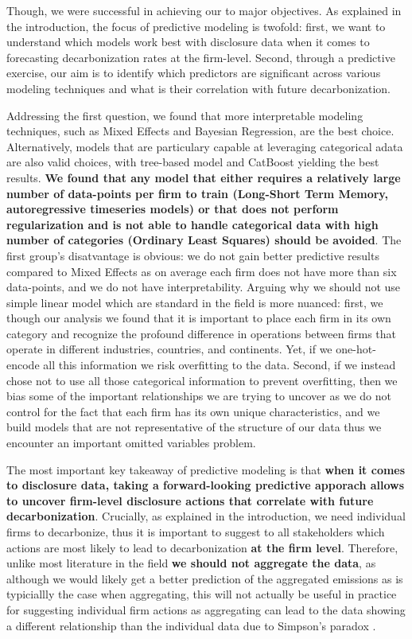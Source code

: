Though, we were successful in achieving our to major objectives. As explained in the introduction, the focus of predictive modeling is twofold: first, we want to understand which models work best with disclosure data when it comes to forecasting decarbonization rates at the firm-level. Second, through a predictive exercise, our aim is to identify which predictors are significant across various modeling techniques and what is their correlation with future decarbonization. 

Addressing the first question, we found that more interpretable modeling techniques, such as Mixed Effects and Bayesian Regression, are the best choice. Alternatively, models that are particulary capable at leveraging categorical adata are also valid choices, with tree-based model and CatBoost yielding the best results. \textbf{We found that any model that either requires a relatively large number of data-points per firm to train (Long-Short Term Memory, autoregressive timeseries models) or that does not perform regularization and is not able to handle categorical data with high number of categories (Ordinary Least Squares) should be avoided}. The first group's disatvantage is obvious: we do not gain better predictive results compared to Mixed Effects as on average each firm does not have more than six data-points, and we do not have interpretability. Arguing why we should not use simple linear model which are standard in the field is more nuanced: first, we though our analysis we found that it is important to place each firm in its own category and recognize the profound difference in operations between firms that operate in different industries, countries, and continents. Yet, if we one-hot-encode all this information we risk overfitting to the data. Second, if we instead chose not to use all those categorical information to prevent overfitting, then we bias some of the important relationships we are trying to uncover as we do not control for the fact that each firm has its own unique characteristics, and we build models that are not representative of the structure of our data thus we encounter an important omitted variables problem. 


The most important key takeaway of predictive modeling is that \textbf{when it comes to disclosure data, taking a forward-looking predictive apporach allows to uncover firm-level disclosure actions that correlate with future decarbonization}.  Crucially, as explained in the introduction, we need individual firms to decarbonize, thus it is important to suggest to all stakeholders which actions are most likely to lead to decarbonization \textbf{at the firm level}. Therefore, unlike most literature in the field
\textbf{we should not aggregate the data}, as although we would likely get a better prediction of the aggregated emissions as is typiciallly the case when aggregating, this will not actually be useful in practice for suggesting individual firm actions as aggregating can lead to the data showing a different relationship than the individual data due to Simpson's paradox \cite{pearl2013understanding}.




